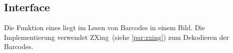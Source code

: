 \subsection{Interface }
Die Funktion eines  liegt im Lesen von Barcodes in einem Bild.
Die Implementierung  verwendet ZXing~(siehe \autoref{par:zxing}) zum Dekodieren der Barcodes.

